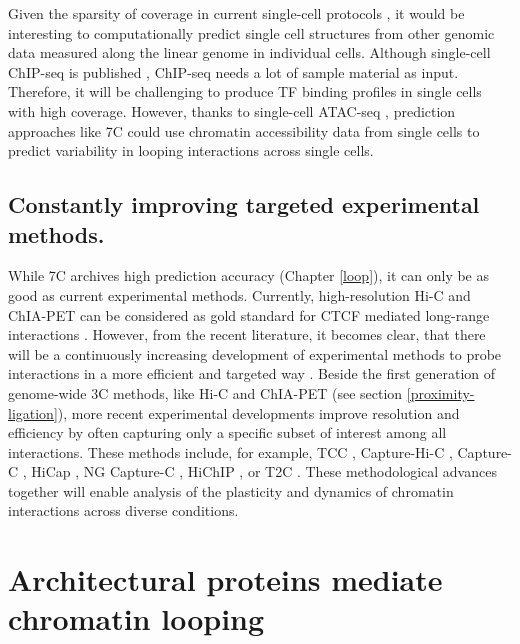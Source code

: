 \documentclass[a4paper,twoside=true,openright,parskip=full,chapterprefix=true,11pt,headings=normal,bibliography=totoc,listof=totoc,titlepage=on,captions=tableabove,draft=false]{scrreprt}
\theoremstyle{definition}
\theoremstyle{definition}
\theoremstyle{definition}
\theoremstyle{remark}
\begin{document}
Given the sparsity of coverage in current single-cell protocols
\citep{Nagano2013, Flyamer2017, Stevens2017}, it would be interesting to
computationally predict single cell structures from other genomic data
measured along the linear genome in individual cells. Although
single-cell ChIP-seq is published \citep{Rotem2015}, ChIP-seq needs a
lot of sample material as input. Therefore, it will be challenging to
produce TF binding profiles in single cells with high coverage. However,
thanks to single-cell ATAC-seq \citep{Buenrostro2015}, prediction
approaches like 7C could use chromatin accessibility data from single
cells to predict variability in looping interactions across single
cells.

\hypertarget{constantly-improving-targeted-experimental-methods.}{%
\subsection{Constantly improving targeted experimental
methods.}\label{constantly-improving-targeted-experimental-methods.}}

While 7C archives high prediction accuracy (Chapter \ref{loop}), it can
only be as good as current experimental methods. Currently,
high-resolution Hi-C and ChIA-PET can be considered as gold standard for
CTCF mediated long-range interactions \citep{Rao2014, Tang2015}.
However, from the recent literature, it becomes clear, that there will
be a continuously increasing development of experimental methods to
probe interactions in a more efficient and targeted way
\citep{Denker2016, Schmitt2016, Davies2017}. Beside the first generation
of genome-wide 3C methods, like Hi-C and ChIA-PET (see section
\ref{proximity-ligation}), more recent experimental developments improve
resolution and efficiency by often capturing only a specific subset of
interest among all interactions. These methods include, for example, TCC
\citep{Kalhor2011}, Capture-Hi-C \citep{Dryden2014}, Capture-C
\citep{Hughes2014}, HiCap \citep{Sahlen2015}, NG Capture-C
\citep{Davies2016}, HiChIP \citep{Mumbach2016}, or T2C
\citep{Kolovos2018}. These methodological advances together will enable
analysis of the plasticity and dynamics of chromatin interactions across
diverse conditions.

\hypertarget{architectural-proteins-mediate-chromatin-looping}{%
\section{Architectural proteins mediate chromatin
looping}\label{architectural-proteins-mediate-chromatin-looping}}
\end{document}
